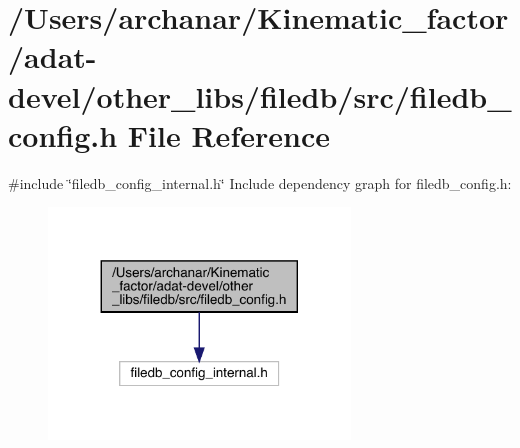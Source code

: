 \hypertarget{adat-devel_2other__libs_2filedb_2src_2filedb__config_8h}{}\section{/\+Users/archanar/\+Kinematic\+\_\+factor/adat-\/devel/other\+\_\+libs/filedb/src/filedb\+\_\+config.h File Reference}
\label{adat-devel_2other__libs_2filedb_2src_2filedb__config_8h}
{\ttfamily \#include \char`\"{}filedb\+\_\+config\+\_\+internal.\+h\char`\"{}}\newline
Include dependency graph for filedb\+\_\+config.\+h\+:
\nopagebreak
\begin{figure}[H]
\begin{center}
\leavevmode
\includegraphics[width=227pt]{df/d18/adat-devel_2other__libs_2filedb_2src_2filedb__config_8h__incl}
\end{center}
\end{figure}

